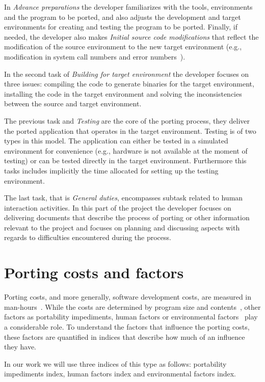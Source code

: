 In \textit{Advance preparations} the developer familiarizes with the tools,
environments and the program to be ported, and also adjusts the development and
target environments for creating and testing the program to be ported. Finally,
if needed, the developer also makes \textit{Initial source code modifications}
that reflect the modification of the source environment to the new target
environment (e.g., modification in system call numbers and error
numbers~\cite{callahanopenbsd}).

In the second task of \textit{Building for target environment} the developer
focuses on three issues: compiling the code to generate binaries for the
target environment, installing the code in the target environment and solving
the inconsistencies between the source and target environment.

The previous task and \textit{Testing} are the core of the porting process, they
deliver the ported application that operates in the target environment.
Testing is of two types in this model. The application can either be tested in a
simulated environment for convenience (e.g., hardware is not available at the
moment of testing) or can be tested directly in the target environment.
Furthermore this tasks includes implicitly the time allocated for setting up the
testing environment.

The last task, that is \textit{General duties}, encompasses subtask related to
human interaction activities. In this part of the project the developer focuses
on delivering documents that describe the process of porting or other
information relevant to the project and focuses on planning and discussing
aspects with regards to difficulties encountered during the process.

\section{Porting costs and factors}

Porting costs, and more generally, software development costs, are measured in
man-hours~\cite{tanaka, hakuta}. While the costs are determined by program size
and contents~\cite{hakuta}, other factors as portability impediments, human
factors or environmental factors~\cite{hakuta} play a considerable role. To
understand the factors that influence the porting costs, these factors are
quantified in indices that describe how much of an influence they have.

In our work we will use three indices of this type as follows: portability
impediments index, human factors index and environmental factors index.


